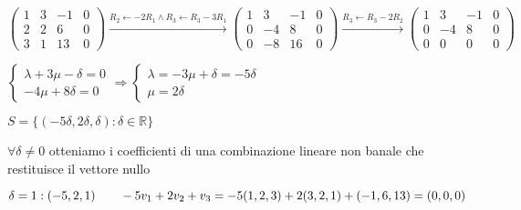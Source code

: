 \documentclass{article}
\newcommand{\R}{\mathbb{R}}
\begin{document}
\begin{enumerate}
\begin{enumerate}
		            $\begin{pmatrix}
				            1 & 3 & -1 & 0 \\
				            2 & 2 & 6  & 0 \\
				            3 & 1 & 13 & 0
			            \end{pmatrix}\xrightarrow{R_2\leftarrow-2R_1\wedge R_3\leftarrow R_3-3R_1}
			            \begin{pmatrix}
				            1 & 3  & -1 & 0 \\
				            0 & -4 & 8  & 0 \\
				            0 & -8 & 16 & 0
			            \end{pmatrix}\xrightarrow{R_3\leftarrow R_3-2R_2}
			            \begin{pmatrix}
				            1 & 3  & -1 & 0 \\
				            0 & -4 & 8  & 0 \\
				            0 & 0  & 0  & 0
			            \end{pmatrix}$

		            $\begin{cases}
				            \lambda+3\mu-\delta=0 \\
				            -4\mu+8\delta=0
			            \end{cases}\Rightarrow
			            \begin{cases}
				            \lambda=-3\mu+\delta=-5\delta \\
				            \mu=2\delta
			            \end{cases}$

		            $S=\{(-5\delta,2\delta,\delta):\delta\in\R\}$

		            $\forall\delta\not=0$ otteniamo i coefficienti di una combinazione lineare non banale che restituisce il vettore nullo

		            $\delta=1:(-5,2,1)\\\qquad-5v_1+2v_2+v_3=-5(1,2,3)+2(3,2,1)+(-1,6,13)=(0,0,0)$
	      \end{enumerate}
\end{enumerate}
\end{document}
